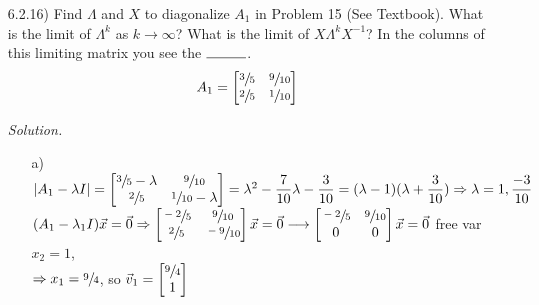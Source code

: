 \documentclass[12pt]{article}
\begin{document}
\begin{itemize}
\item[6.2.16)] Find $\Lambda$ and $X$ to diagonalize $A_1$ in Problem 15 (See Textbook). 
			   What is the limit of $\Lambda^k$ as $k \rightarrow\infty$? 
               What is the limit of $X\Lambda^k X^{-1}$? 
               In the columns of this limiting matrix you see the $\rule{1cm}{0.15mm}$.
               \[A_1=\begin{bmatrix}
               \sfrac{3}{5} & \sfrac{9}{10} \\ \sfrac{2}{5} & \sfrac{1}{10}
               \end{bmatrix}\]
            
\textit{Solution.}
\begin{itemize}
\item[a)] $|A_1-\lambda I|=\begin{bmatrix}
			\sfrac{3}{5} -\lambda & \sfrac{9}{10} \\ \sfrac{2}{5} & \sfrac{1}{10} -\lambda
			\end{bmatrix}
            =\lambda^2-\dfrac{7}{10}\lambda-\dfrac{3}{10}=(\lambda-1)(\lambda+\dfrac{3}{10})
            \Rightarrow \lambda=1,\dfrac{-3}{10}$ \\
            
            $(A_1-\lambda_1 I)\vec{x}=\vec{0}\Rightarrow
            \begin{bmatrix}
            \sfrac{-2}{5} & \sfrac{9}{10} \\ \sfrac{2}{5} & \sfrac{-9}{10}
            \end{bmatrix}\vec{x}=\vec{0}\longrightarrow
            \begin{bmatrix}
            \sfrac{-2}{5} & \sfrac{9}{10} \\ 0 & 0
            \end{bmatrix}\vec{x}=\vec{0}$ free var $x_2=1$, \\
            $\Rightarrow x_1=\sfrac{9}{4}$, so $\vec{v}_1=\begin{bmatrix}\sfrac{9}{4} \\ 1\end{bmatrix}$ \\
            

\end{itemize}
\end{itemize}
\end{document}
